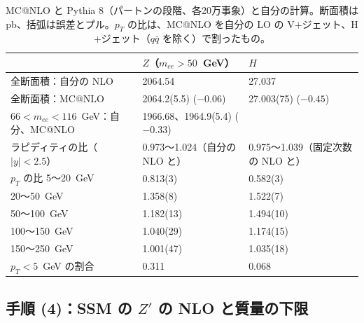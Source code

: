 \documentclass[a4paper,10pt]{ltjsarticle}
\begin{document}
\begin{table}[htbp]
\centering\small
\caption{MC@NLO と Pythia 8（パートンの段階、各20万事象）と自分の計算。断面積は pb、括弧は誤差とプル。$p_T$ の比は、MC@NLO を自分の LO の V$+$ジェット、H$+$ジェット（$q\bar q$ を除く）で割ったもの。}
\label{tab:mc}
\begin{tabular}{lll}
\toprule
 & $Z$（$m_{ee}>50$~GeV） & $H$ \\
\midrule
全断面積：自分の NLO & 2064.54 & 27.037 \\
全断面積：MC@NLO & 2064.2(5.5) ($-0.06$) & 27.003(75) ($-0.45$) \\
$66<m_{ee}<116$~GeV：自分、MC@NLO & 1966.68、1964.9(5.4) ($-0.33$) & \\
ラピディティの比（$|y|<2.5$） & 0.973〜1.024（自分の NLO と） & 0.975〜1.039（固定次数の NLO と） \\
$p_T$ の比 5〜20~GeV & 0.813(3) & 0.582(3) \\
\phantom{$p_T$ の比 }20〜50~GeV & 1.358(8) & 1.522(7) \\
\phantom{$p_T$ の比 }50〜100~GeV & 1.182(13) & 1.494(10) \\
\phantom{$p_T$ の比 }100〜150~GeV & 1.040(29) & 1.174(15) \\
\phantom{$p_T$ の比 }150〜250~GeV & 1.001(47) & 1.035(18) \\
$p_T<5$~GeV の割合 & 0.311 & 0.068 \\
\bottomrule
\end{tabular}
\end{table}

\subsection{手順 (4)：SSM の $Z'$ の NLO と質量の下限}\label{sec:step4}
\end{document}
